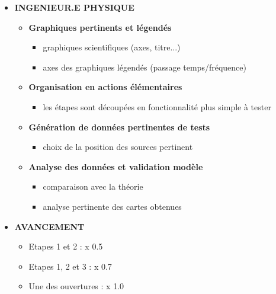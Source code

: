 \begin{itemize}
	\item \textbf{INGENIEUR.E PHYSIQUE}
	\begin{itemize}
		\item \textbf{Graphiques pertinents et légendés}
		\begin{itemize}
			\item graphiques scientifiques (axes, titre...)
			\item axes des graphiques légendés (passage temps/fréquence)
		\end{itemize}		 
		\item \textbf{Organisation en actions élémentaires}
		\begin{itemize}
			\item les étapes sont découpées en fonctionnalité plus simple à tester
		\end{itemize}
		\item \textbf{Génération de données pertinentes de tests}
		\begin{itemize}
			\item choix de la position des sources pertinent
		\end{itemize}
		\item \textbf{Analyse des données et validation modèle}
		\begin{itemize}
			\item comparaison avec la théorie
			\item analyse pertinente des cartes obtenues
		\end{itemize}
	\end{itemize}
	
\medskip	
	
	\item \textbf{AVANCEMENT}
	\begin{itemize}
		\item Etapes 1 et 2 : x 0.5
		\item Etapes 1, 2 et 3 : x 0.7
		\item Une des ouvertures : x 1.0
	\end{itemize}
\end{itemize}



